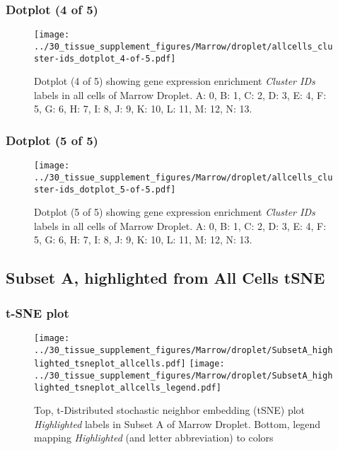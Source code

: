 \clearpage

\subsubsection{Dotplot (4 of 5)}
\begin{figure}[h]
\centering
\texttt{[image: ../30\_tissue\_supplement\_figures/Marrow/droplet/allcells\_cluster-ids\_dotplot\_4-of-5.pdf]}

\caption{ Dotplot (4 of 5)  showing gene expression enrichment \emph{Cluster IDs} labels in all cells of Marrow Droplet. A: 0, B: 1, C: 2, D: 3, E: 4, F: 5, G: 6, H: 7, I: 8, J: 9, K: 10, L: 11, M: 12, N: 13.}
\end{figure}


\clearpage

\subsubsection{Dotplot (5 of 5)}
\begin{figure}[h]
\centering
\texttt{[image: ../30\_tissue\_supplement\_figures/Marrow/droplet/allcells\_cluster-ids\_dotplot\_5-of-5.pdf]}

\caption{ Dotplot (5 of 5)  showing gene expression enrichment \emph{Cluster IDs} labels in all cells of Marrow Droplet. A: 0, B: 1, C: 2, D: 3, E: 4, F: 5, G: 6, H: 7, I: 8, J: 9, K: 10, L: 11, M: 12, N: 13.}
\end{figure}


\clearpage
\subsection{Subset A, highlighted from All Cells tSNE}
\subsubsection{t-SNE plot}
\begin{figure}[h]
\centering
\texttt{[image: ../30\_tissue\_supplement\_figures/Marrow/droplet/SubsetA\_highlighted\_tsneplot\_allcells.pdf]}
\texttt{[image: ../30\_tissue\_supplement\_figures/Marrow/droplet/SubsetA\_highlighted\_tsneplot\_allcells\_legend.pdf]}
\caption{Top, t-Distributed stochastic neighbor embedding (tSNE) plot  \emph{Highlighted} labels in Subset A of Marrow Droplet. Bottom, legend mapping \emph{Highlighted} (and letter abbreviation) to colors}
\end{figure}


